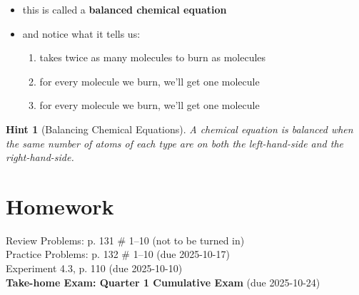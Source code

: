 \documentclass[11pt, oneside]{article}   	%
\newtheorem{hint}{Hint}
\begin{document}
\begin{itemize}
\begin{center}
 \end{center}
\item this is called a \textbf{balanced chemical equation}
\item and notice what it tells us:
\begin{enumerate}
\item {} takes twice as many  molecules to burn as  molecules 
\item for every  molecule we burn, we'll get one  molecule
\item for every  molecule we burn, we'll get one  molecule
\end{enumerate}
\end{itemize}

\begin{hint}[Balancing Chemical Equations]
A chemical equation is balanced when the same number of atoms of each type are on both the left-hand-side and the right-hand-side.
\end{hint}

\section{Homework}
Review Problems: p. 131 \# 1--10 (not to be turned in)\\
Practice Problems: p. 132 \# 1--10 (due 2025-10-17)\\
Experiment 4.3, p. 110 (due 2025-10-10)\\
\textbf{Take-home Exam: Quarter 1 Cumulative Exam} (due 2025-10-24) \\



\nocite{wile-chem-2}
{}

\end{document}
